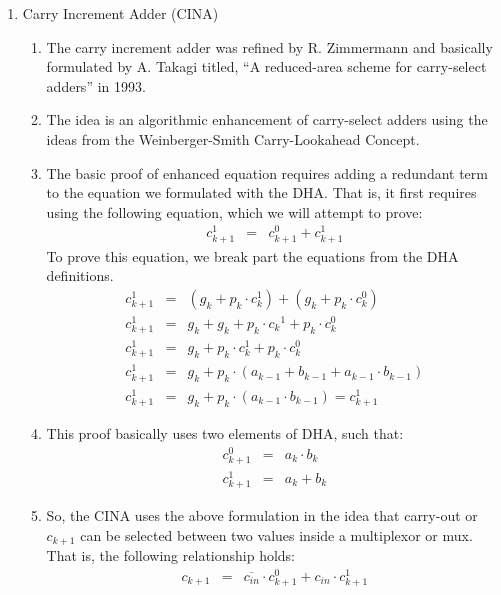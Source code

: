 \documentclass[times, twocolumn, 10pt]{article}
\begin{document}
\begin{enumerate}
\item Carry Increment Adder (CINA)
\begin{enumerate}
\item The carry increment adder was refined by R. Zimmermann and
  basically formulated by A. Takagi titled, ``A reduced-area scheme for
  carry-select adders'' in 1993.
\item The idea is an algorithmic enhancement of carry-select adders using the
  ideas from the Weinberger-Smith Carry-Lookahead Concept.
\item The basic proof of enhanced equation requires adding a redundant
  term to the equation we formulated with the DHA.  That is, 
  it first requires using the following equation, which we will
  attempt to prove:
  \begin{eqnarray*}
    c_{k+1}^1 & = & c_{k+1}^0 + c_{k+1}^1
  \end{eqnarray*}
  To prove this equation, we break part the equations from the DHA
  definitions.  
  \begin{eqnarray*}
    c_{k+1}^{1} & = & (g_k + p_k \cdot c_k^{1}) + (g_k + p_k \cdot
    c_k^{0})  \\
    c_{k+1}^{1} & = & g_k + g_k + p_k \cdot {c_k}^{1} + p_k \cdot c_k^{0} \\
    c_{k+1}^{1} & = & g_k + p_k \cdot c_k^{1} + p_k \cdot c_k^{0} \\
    c_{k+1}^{1} & = & g_k + p_k \cdot (a_{k-1} + b_{k-1} + 
    a_{k-1} \cdot b_{k-1}) \\
    c_{k+1}^{1} & = & g_k + p_k \cdot (a_{k-1} \cdot b_{k-1}) =
    c_{k+1}^1
  \end{eqnarray*}

\item This proof basically uses two elements of DHA, such that:
  \begin{eqnarray*}
    c_{k+1}^0 & = & a_k \cdot b_k \\
    c_{k+1}^1 & = & a_k + b_k 
  \end{eqnarray*}

\item So, the CINA uses the above formulation in the idea that carry-out or
  $c_{k+1}$ can be selected between two values inside a multiplexor or mux.
  That is, the following relationship holds:
\begin{eqnarray*}
c_{k+1} & = & \overline{c_{in}} \cdot c_{k+1}^0 + c_{in} \cdot c_{k+1}^1 
\end{eqnarray*}


\end{enumerate}
\end{enumerate}
\end{document}
